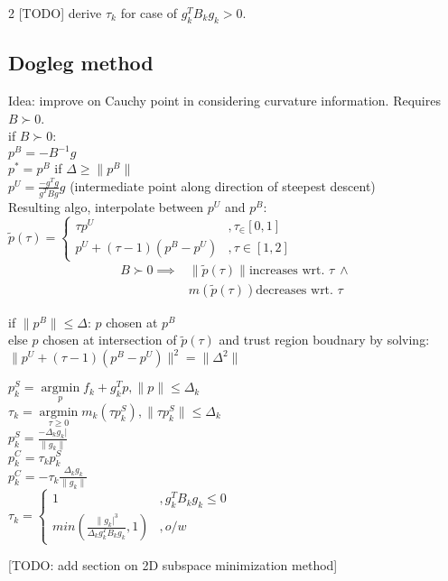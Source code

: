 \documentclass[8pt,letter]{article}
\DeclareMathOperator*{\argmin}{argmin}
\newcommand*{\argminl}{\argmin\limits}
\begin{document}
\begin{multicols*}{2}
  [TODO] derive $\tau_k$ for case of $g_k^T B_k g_k > 0$.
  
  \subsection{Dogleg method}

  Idea: improve on Cauchy point in considering curvature information. Requires $B \succ 0$.\\
  
  if $B \succ 0$:\\
  $p^B=-B^{-1}g$\\
  $p^*=p^B$ if $\Delta \geq \|p^B\|$\\
  $p^U=\frac{-g^Tg}{g^TBg}g$ (intermediate point along direction of steepest descent)\\
  Resulting algo, interpolate between $p^U$ and $p^B$:\\
  $\tilde{p}(\tau) =
  \begin{cases}
    \tau p^U &, \tau_\in [0,1]\\
    p^U + (\tau-1)(p^B-p^U) &, \tau \in [1,2]
  \end{cases}
  $
  \begin{align*}
    B \succ 0 \implies & \|\tilde{p}(\tau)\| \text{increases wrt. }\tau\ \land\\
    & m(\tilde{p}(\tau)) \text{decreases wrt. } \tau
  \end{align*}
  
  if $\|p^B\| \leq \Delta$: $p$ chosen at $p^B$\\
  else $p$ chosen at intersection of $\tilde{p}(\tau)$ and trust region boudnary by solving:\\
  $\|p^U+(\tau-1)(p^B-p^U)\|^2 = \|\Delta^2\|$

  $p_k^S=\argminl_p f_k+g_k^Tp, \|p\| \leq \Delta_k$\\
  $\tau_k = \argminl_{\tau\geq0} m_k(\tau p_k^S), \|\tau p_k^S\| \leq \Delta_k$\\
  $p_k^S=\frac{-\Delta_k g_k|}{\|g_k\|}$\\
  $p_k^C=\tau_k p_k^S$\\
  $p_k^C=-\tau_k \frac{\Delta_k g_k}{\|g_k\|}$\\
  $\tau_k=\begin{cases}
    1 &, g_k^T B_k g_k \leq 0\\
    min(\frac{\|g_k|^3}{\Delta_k g_k^T B_k g_k}, 1) &, o/w
  \end{cases}$

  [TODO: add section on 2D subspace minimization method]\\
  

\end{multicols*}
\end{document}
